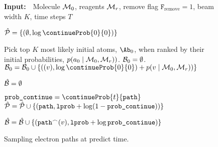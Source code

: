 \begin{wrapfigure}{R}{0.5\textwidth}
\begin{minipage}{1.\textwidth}
\begin{algorithm}[H]
  \caption{Sampling electron paths at predict time.}
  {\bf Input:}~~Molecule ${\mathcal{M}}_0$, reagents ${\mathcal{M}}_r$, remove flag $\texttt{F}_\textrm{remove} \!=\!1$, beam width $K$, time steps $T$
  
  \begin{algorithmic}[1]
  	\STATE $\hat{\Pc} = \{(\emptyset, \log \continueProb{0}{0}) \}$  
  	
    \STATE Pick top $K$ most likely initial atoms, $\Ab_0$, when ranked by their initial probabilities, $p(a_0 \mid {\mathcal{M}}_0, {\mathcal{M}}_r))$.
	\STATE ${\mathcal{B}}_0 = \emptyset$.  
		\STATE $\Bc_0 = \Bc_0 \cup \{((v), \log \continueProb{0}{0}) + p(v \mid \moleculeSet_0, \moleculeSet_r))\}$
	\ENDFOR
	
		\STATE $\hat{{\mathcal{B}}} = \emptyset $ 
		
			
			\STATE $\texttt{prob\_continue} = \continueProb{t}{\texttt{path}}$
			\STATE $\hat{{\mathcal{P}}} = \hat{{\mathcal{P}}} \cup \{(\texttt{path}, \texttt{lprob} + \log (1 -  \texttt{prob\_continue}))\}$
			
				\STATE $\hat{{\mathcal{B}}} = \hat{{\mathcal{B}}} \cup \{( \texttt{path}^\frown (v), \texttt{lprob} + \log \texttt{prob\_continue} )\}$
			\ENDFOR
		\ENDFOR
	\ENDFOR
    

\end{algorithmic}
\end{algorithm}
\end{minipage}
\end{wrapfigure}
